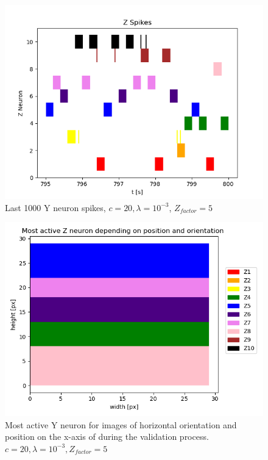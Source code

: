\begin{figure}
  \includegraphics[width=\linewidth]{figures/horvert/horvert_c20_3_Zfactor5_1000LastZSpikes.png}
  \caption{Last 1000 Y neuron spikes, $c = 20, \lambda = 10^{-3}$, $Z_{factor} = 5$}
  \label{fig:horvertLastSpikes}
\end{figure}

\begin{figure}
  \includegraphics[width=\linewidth]{figures/horvert/horvert_c20_3_Zfactor5_horizontalLines.png}
  \caption{Most active Y neuron for images of horizontal orientation and position on the x-axis of during the validation process. $c = 20, \lambda = 10^{-3}, Z_{factor} = 5$}
  \label{fig:horvert_c20_3_Zfactor5_horizontalLines}
\end{figure}

